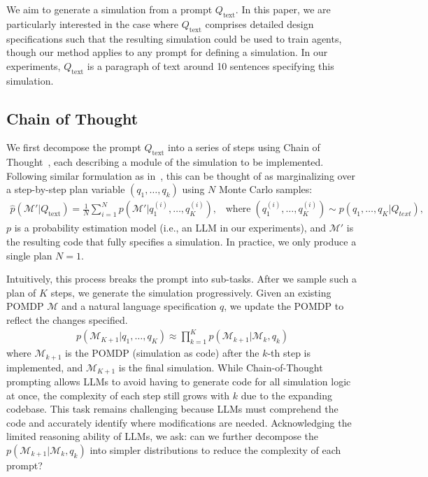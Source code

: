 \documentclass{article}
\theoremstyle{plain}
\theoremstyle{definition}
\theoremstyle{remark}
\begin{document}
We aim to generate a simulation from a prompt $Q_{\text{text}}$. In this paper, we are particularly interested in the case where $Q_{\text{text}}$ comprises detailed design specifications such that the resulting simulation could be used to train agents, though our method applies to any prompt for defining a simulation. In our experiments, $Q_{\text{text}}$ is a paragraph of text around 10 sentences specifying this simulation.
\vspace{-1mm}
\subsection{Chain of Thought}
We first decompose the prompt $Q_{\text{text}}$ into a series of steps using Chain of Thought~\cite{wei2022chain}, each describing a module of the simulation to be implemented.
Following similar formulation as in~\cite{prystawski2024think}, this can be thought of as marginalizing over a step-by-step plan variable $(q_1,\ldots,q_k)$ using $N$ Monte Carlo samples:
\begin{align} \label{eq:chain_of_thought}
\hat{p}(\mathcal{M}' | Q_\text{text}) = \frac{1}{N}\sum^N_{i=1} p(\mathcal{M}' | q^{(i)}_1,\ldots,q^{(i)}_K), \;\;\;\text{where} \;(q^{(i)}_1,\ldots,q^{(i)}_K) \sim p(q_1,\ldots,q_K | Q_\textit{text}),
\end{align} 
$p$ is a probability estimation model (i.e., an LLM in our experiments), and $\mathcal{M}'$ is the resulting code that fully specifies a simulation. In practice, we only produce a single plan $N=1$. 

Intuitively, this process breaks the prompt into sub-tasks.
After we sample such a plan of $K$ steps, we generate the simulation progressively.
Given an existing POMDP $\mathcal{M}$ and a natural language specification $q$, we update the POMDP to reflect the changes specified.
\begin{align}
p(\mathcal{M}_{K+1} | q_1,\ldots,q_K) \approx \prod^K_{k=1}p(\mathcal{M}_{k+1} | \mathcal{M}_k, q_k)  
\end{align}
where $\mathcal{M}_{k+1}$ is the POMDP (simulation as code) after the $k$-th step is implemented, and $\mathcal{M}_{K+1}$ is the final simulation. While Chain-of-Thought prompting allows LLMs to avoid having to generate code for all simulation logic at once, 
the complexity of each step still grows with $k$ due to the expanding codebase. This task remains challenging because LLMs must comprehend the code and accurately identify where modifications are needed.
Acknowledging the limited reasoning ability of LLMs, we ask: can we further decompose the $p(\mathcal{M}_{k+1} | \mathcal{M}_k, q_k)$ into simpler distributions to reduce the complexity of each prompt?
\end{document}
